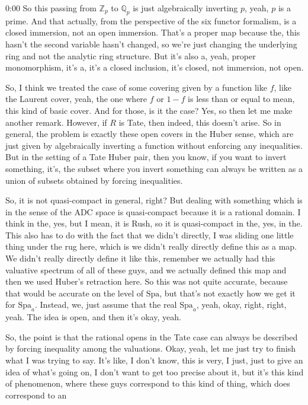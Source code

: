 \begin{unfinished}{0:00}
So this passing from $\mathbb{Z}_p$ to $\mathbb{Q}_p$ is just algebraically inverting $p$, yeah, $p$ is a prime. And that actually, from the perspective of the six functor formalism, is a closed immersion, not an open immersion. That's a proper map because the, this hasn't the second variable hasn't changed, so we're just changing the underlying ring and not the analytic ring structure. But it's also a, yeah, proper monomorphism, it's a, it's a closed inclusion, it's closed, not immersion, not open.

So, I think we treated the case of some covering given by a function like $f$, like the Laurent cover, yeah, the one where $f$ or $1-f$ is less than or equal to mean, this kind of basic cover. And for those, is it the case? Yes, so then let me make another remark. However, if $R$ is Tate, then indeed, this doesn't arise. So in general, the problem is exactly these open covers in the Huber sense, which are just given by algebraically inverting a function without enforcing any inequalities. But in the setting of a Tate Huber pair, then you know, if you want to invert something, it's, the subset where you invert something can always be written as a union of subsets obtained by forcing inequalities.

So, it is not quasi-compact in general, right? But dealing with something which is in the sense of the ADC space is quasi-compact because it is a rational domain. I think in the, yes, but I mean, it is Rush, so it is quasi-compact in the, yes, in the. This also has to do with the fact that we didn't directly, I was sliding one little thing under the rug here, which is we didn't really directly define this as a map. We didn't really directly define it like this, remember we actually had this valuative spectrum of all of these guys, and we actually defined this map and then we used Huber's retraction here. So this was not quite accurate, because that would be accurate on the level of $\mathrm{Spa}$, but that's not exactly how we get it for $\mathrm{Spa}_a$. Instead, we, just assume that the real $\mathrm{Spa}_a$, yeah, okay, right, right, yeah. The idea is open, and then it's okay, yeah.

So, the point is that the rational opens in the Tate case can always be described by forcing inequality among the valuations. Okay, yeah, let me just try to finish what I was trying to say. It's like, I don't know, this is very, I just, just to give an idea of what's going on, I don't want to get too precise about it, but it's this kind of phenomenon, where these guys correspond to this kind of thing, which does correspond to an


\end{unfinished}
